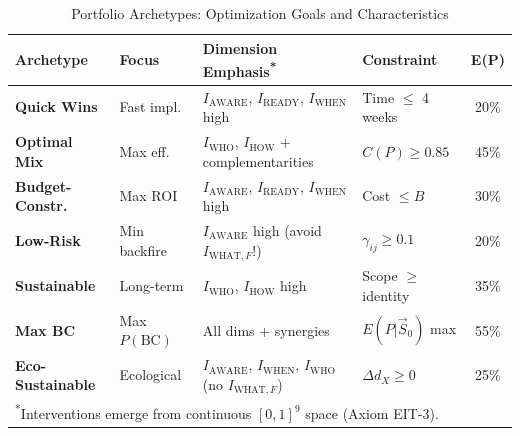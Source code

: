 \begin{table}[htbp]
\centering
\caption{Portfolio Archetypes: Optimization Goals and Characteristics}
\label{tab:hhh-archetypes}
\renewcommand{\arraystretch}{1.4}
\footnotesize
\begin{tabular}{@{}llp{4.5cm}lc@{}}
\toprule
\textbf{Archetype} & \textbf{Focus} & \textbf{Dimension Emphasis}\textsuperscript{*} & \textbf{Constraint} & \textbf{E(P)} \\
\midrule
\textbf{Quick Wins} & Fast impl. & $I_{\text{AWARE}}$, $I_{\text{READY}}$, $I_{\text{WHEN}}$ high & Time $\leq$ 4 weeks & 20\% \\
\textbf{Optimal Mix} & Max eff. & $I_{\text{WHO}}$, $I_{\text{HOW}}$ + complementarities & $C(P) \geq 0.85$ & 45\% \\
\textbf{Budget-Constr.} & Max ROI & $I_{\text{AWARE}}$, $I_{\text{READY}}$, $I_{\text{WHEN}}$ high & Cost $\leq B$ & 30\% \\
\textbf{Low-Risk} & Min backfire & $I_{\text{AWARE}}$ high (avoid $I_{\text{WHAT},F}$!) & $\gamma_{ij} \geq 0.1$ & 20\% \\
\textbf{Sustainable} & Long-term & $I_{\text{WHO}}$, $I_{\text{HOW}}$ high & Scope $\geq$ identity & 35\% \\
\textbf{Max BC} & Max $P(\text{BC})$ & All dims + synergies & $E(P|\vec{S}_0)$ max & 55\% \\
\textbf{Eco-Sustainable} & Ecological & $I_{\text{AWARE}}$, $I_{\text{WHEN}}$, $I_{\text{WHO}}$ (no $I_{\text{WHAT},F}$) & $\Delta d_X \geq 0$ & 25\% \\
\bottomrule
\multicolumn{5}{l}{\textsuperscript{*}\footnotesize Interventions emerge from continuous $[0,1]^9$ space (Axiom EIT-3).}
\end{tabular}
\end{table}

